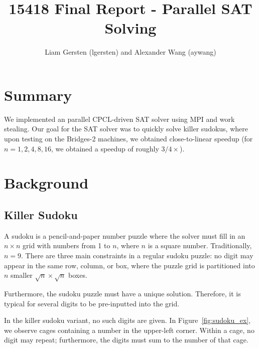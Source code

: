 \documentclass{article}
\title{15418 Final Report - Parallel SAT Solving}
\author{Liam Gersten (lgersten) and Alexander Wang (aywang)}
\begin{document}
\maketitle
\tableofcontents

\section{Summary}
We implemented an parallel CPCL-driven SAT solver using MPI and work stealing.
Our goal for the SAT solver was to quickly solve killer sudokus, where upon testing on the Bridges-2 machines, we obtained close-to-linear speedup (for $n=1,2,4,8,16$, we obtained a speedup of roughly $3/4\times$).

\section{Background}

\subsection{Killer Sudoku}
A sudoku is a pencil-and-paper number puzzle where the solver must fill in an $n \times n$ grid with numbers from 1 to $n$, where $n$ is a square number.
Traditionally, $n = 9$.
There are three main constraints in a regular sudoku puzzle: no digit may appear in the same row, column, or box, where the puzzle grid is partitioned into $n$ smaller $\sqrt{n} \times \sqrt n$ boxes.

Furthermore, the sudoku puzzle must have a unique solution.
Therefore, it is typical for several digits to be pre-inputted into the grid.

In the killer sudoku variant, no such digits are given.
In Figure~\ref{fig:sudoku_ex}, we observe cages containing a number in the upper-left corner.
Within a cage, no digit may repeat;
furthermore, the digits must sum to the number of that cage.
\end{document}
